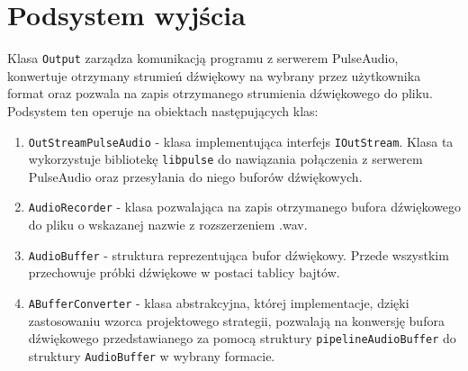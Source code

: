 \section{Podsystem wyjścia}
Klasa \texttt{Output} zarządza komunikacją programu z serwerem PulseAudio\cite{bib:PulseAudio}, konwertuje otrzymany strumień dźwiękowy na wybrany przez użytkownika format oraz pozwala na zapis otrzymanego strumienia dźwiękowego do pliku. Podsystem ten operuje na obiektach następujących klas:
\begin{enumerate}
    \item \texttt{OutStreamPulseAudio} - klasa implementująca interfejs \texttt{IOutStream}. Klasa ta wykorzystuje bibliotekę \texttt{libpulse} do nawiązania połączenia z serwerem PulseAudio\cite{bib:PulseAudio} oraz przesyłania do niego buforów dźwiękowych.
    \item \texttt{AudioRecorder} - klasa pozwalająca na zapis otrzymanego bufora dźwiękowego do pliku o wskazanej nazwie z rozszerzeniem .wav.
    \item \texttt{AudioBuffer} - struktura reprezentująca bufor dźwiękowy. Przede wszystkim przechowuje próbki dźwiękowe w postaci tablicy bajtów.
    \item \texttt{ABufferConverter} - klasa abstrakcyjna, której implementacje, dzięki zastosowaniu wzorca projektowego strategii\cite{bib:DesignPatterns}, pozwalają na konwersję bufora dźwiękowego przedstawianego za pomocą struktury \texttt{pipelineAudioBuffer} do struktury \texttt{AudioBuffer} w wybrany formacie. 
\end{enumerate}

